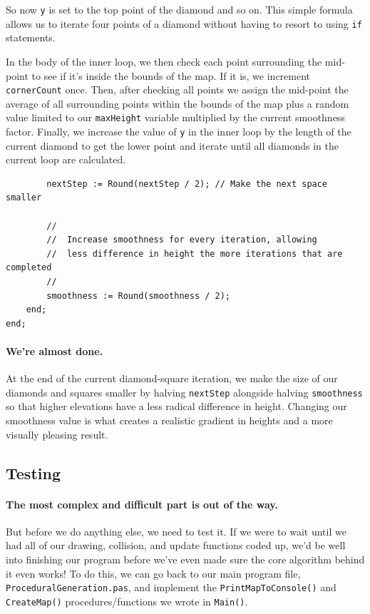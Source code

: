 \documentclass{article}
\begin{document}
So now \texttt{y} is set to the top point of the diamond and so on. This simple formula allows us to iterate four points of a diamond without having to resort to using \texttt{if} statements.

In the body of the inner loop, we then check each point surrounding the mid-point to see if it's inside the bounds of the map. If it is, we increment \texttt{cornerCount} once. Then, after checking all points we assign the mid-point the average of all surrounding points within the bounds of the map plus a random value limited to our \texttt{maxHeight} variable multiplied by the current smoothness factor. Finally, we increase the value of \texttt{y} in the inner loop by the length of the current diamond to get the lower point and iterate until all diamonds in the current loop are calculated.

\begin{verbatim}
		nextStep := Round(nextStep / 2); // Make the next space smaller

		//
		//	Increase smoothness for every iteration, allowing
		//	less difference in height the more iterations that are completed
		//
		smoothness := Round(smoothness / 2);
	end;
end;
\end{verbatim}

\paragraph{We're almost done.} At the end of the current diamond-square iteration, we make the size of our diamonds and squares smaller by halving \texttt{nextStep} alongside halving \texttt{smoothness} so that higher elevations have a less radical difference in height. Changing our smoothness value is what creates a realistic gradient in heights and a more visually pleasing result.

\subsection{Testing}

\paragraph{The most complex and difficult part is out of the way.}But before we do anything else, we need to test it. If we were to wait until we had all of our drawing, collision, and update functions coded up, we'd be well into finishing our program before we've even made sure the core algorithm behind it even works! To do this, we can go back to our main program file, \texttt{ProceduralGeneration.pas}, and implement the \texttt{PrintMapToConsole()} and \texttt{CreateMap()} procedures/functions we wrote in \texttt{Main()}.
\end{document}
